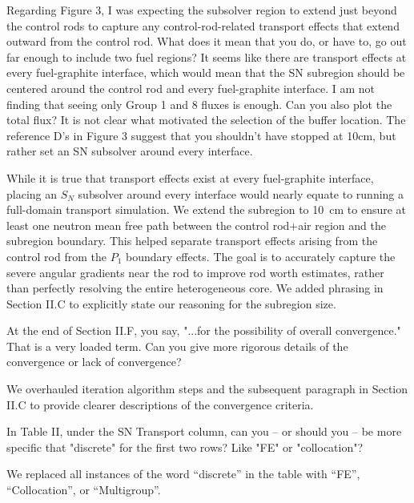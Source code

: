 \documentclass[answers,11pt]{exam}
\begin{document}
\begin{questions}
    \question Regarding Figure 3, I was expecting the subsolver region to extend just beyond the control rods to capture any control-rod-related transport effects that extend outward from the control rod. What does it mean that you do, or have to, go out far enough to include two fuel regions? It seems like there are transport effects at every fuel-graphite interface, which would mean that the SN subregion should be centered around the control rod and every fuel-graphite interface. I am not finding that seeing only Group 1 and 8 fluxes is enough. Can you also plot the total flux? It is not clear what motivated the selection of the buffer location. The reference D's in Figure 3 suggest that you shouldn't have stopped at 10cm, but rather set an SN subsolver around every interface.
    \begin{solution}
        While it is true that transport effects exist at every fuel-graphite interface, placing an
        $S_N$ subsolver around every interface would nearly equate to running a full-domain transport
        simulation. We extend the subregion to 10~cm to ensure at least one neutron mean free path
        between the control rod+air region and the subregion boundary. This helped separate
        transport effects arising from the control rod from the $P_1$ boundary effects. The goal is
        to accurately capture the severe angular gradients near the rod to improve rod worth
        estimates, rather than perfectly resolving the entire heterogeneous core.
        We added phrasing in Section II.C to explicitly state our reasoning for the subregion size.
    \end{solution}

    \question At the end of Section II.F, you say, "...for the possibility of overall convergence." That is a very loaded term. Can you give more rigorous details of the convergence or lack of convergence?
    \begin{solution}
        We overhauled iteration algorithm steps and the subsequent paragraph in Section II.C to
        provide clearer descriptions of the convergence criteria.
    \end{solution}

    \question In Table II, under the SN Transport column, can you -- or should you -- be more specific that "discrete" for the first two rows? Like "FE" or "collocation"?
    \begin{solution}
        We replaced all instances of the word ``discrete'' in the table with ``FE'',
        ``Collocation'', or ``Multigroup''.
    \end{solution}


\end{questions}
\end{document}
